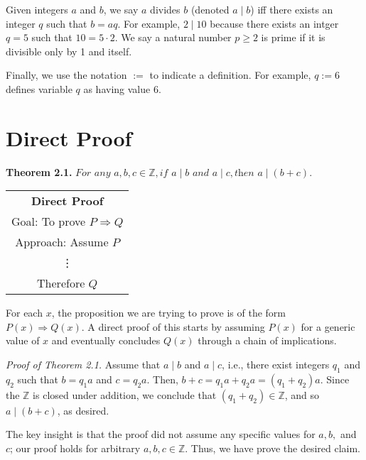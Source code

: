 \documentclass[12pt,a4paper]{article}
\begin{document}
\bigbreak

Given integers $a$ and $b$, we say $a$ divides $b$ (denoted $a\mid b$) iff there exists an integer $q$ such that $b=aq$. For example, $2\mid 10$ because there exists an intger $q=5$ such that $10=5\cdot 2$. We say a natural number $p\geq 2$ is prime if it is divisible only by 1 and itself.

\bigbreak

Finally, we use the notation $:=$ to indicate a definition. For example, $q:=6$ defines variable $q$ as having value 6.

\newpage

\section*{Direct Proof}

\textbf{Theorem 2.1.} $\textit{For any } a,b,c \in \mathbb{Z}, \textit{if } a\mid b \textit{ and } a\mid c, \textit{then } a\mid (b+c)$.

\begin{center}
	\begin{tabular}{|c|}
	\hline 
	\rule[-1ex]{0pt}{2.5ex} \textbf{Direct Proof}\\ 
	\rule[-1ex]{0pt}{2.5ex} Goal: To prove $P\Rightarrow Q$ \\ 
	\rule[-1ex]{0pt}{2.5ex} Approach: Assume $P$  \\ 
	\rule[-1ex]{0pt}{2.5ex} \vdots \\ 
	\rule[-1ex]{0pt}{2.5ex} Therefore $Q$ \\ 
	\hline
\end{tabular} 
\end{center}

For each $x$, the proposition we are trying to prove is of the form $P(x)\Rightarrow Q(x)$. A direct proof of this starts by assuming $P(x)$ for a generic value of $x$ and eventually concludes $Q(x)$ through a chain of implications.

\bigbreak

\textit{Proof of Theorem 2.1.} Assume that $a\mid b$ and $a\mid c$, i.e., there exist integers $q_1$ and $q_2$ such that $b=q_1a$ and $c=q_2a$. Then, $b+c=q_1a+q_2a=(q_1+q_2)a$. Since the $\mathbb{Z}$ is closed under addition, we conclude that $(q_1+q_2)\in\mathbb{Z}$, and so $a\mid(b+c)$, as desired.

\bigbreak

The key insight is that the proof did not assume any specific values for $a,b,$ and $c$; our proof holds for arbitrary $a,b,c\in\mathbb{Z}$. Thus, we have prove the desired claim.
\end{document}
